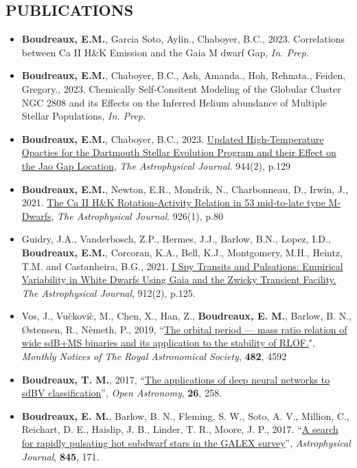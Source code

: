 \documentclass[margin, 10pt]{res} %
\begin{document}
\begin{resume}
\section{PUBLICATIONS}
\begin{itemize}
  \item \textbf{Boudreaux, E.M.}, Garcia Soto, Aylin., Chaboyer, B.C., 2023. Correlations between Ca II H\&K Emission and the Gaia M dwarf Gap, \textit{In. Prep.}
  \item \textbf{Boudreaux, E.M.}, Chaboyer, B.C., Ash, Amanda., Hoh, Rehnata., Feiden, Gregory., 2023. Chemically Self-Consitent Modeling of the Globular Cluster NGC 2808 and its Effects on the Inferred Helium abundance of Multiple Stellar Populations, \textit{In. Prep.}
	\item \textbf{Boudreaux, E.M.}, Chaboyer, B.C., 2023. \href{https://ui.adsabs.harvard.edu/abs/2023arXiv230110798B/abstract}{Updated High-Temperature Opacties for the Dartmouth Stellar Evolution Program and their Effect on the Jao Gap Location}, \textit{The Astrophysical Journal}. 944(2), p.129
	\item \textbf{Boudreaux, E.M.}, Newton, E.R., Mondrik, N., Charbonneau, D., Irwin, J., 2021. \href{https://ui.adsabs.harvard.edu/abs/2022ApJ...929...80B/abstract}{The Ca II H\&K Rotation-Activity Relation in 53 mid-to-late type M-Dwarfs}, \textit{The Astrophysical Journal}. 926(1), p.80
	\item Guidry, J.A., Vanderbosch, Z.P., Hermes, J.J., Barlow, B.N., Lopez, I.D., \textbf{Boudreaux, E.M.}, Corcoran, K.A., Bell, K.J., Montgomery, M.H., Heintz, T.M. and Castanheira, B.G., 2021. \href{https://ui.adsabs.harvard.edu/abs/2021ApJ...912..125G/abstract}{I Spy Transits and Pulsations: Empirical Variability in White Dwarfs Using Gaia and the Zwicky Transient Facility.} \textit{The Astrophysical Journal}, 912(2), p.125.
\item Vos, J., Vu\u{c}kovi\`c, M., Chen, X., Han, Z., \textbf{Boudreaux, E. M.}, Barlow, B. N., \O stensen, R., N\`emeth, P., 2019, ``\href{https://ui.adsabs.harvard.edu/#abs/2019MNRAS.482.4592V/abstract}{The orbital period --- mass ratio relation of wide sdB+MS binaries and its application to the stability of RLOF.}", \textit{Monthly Notices of The Royal Astronomical Society}, \textbf{482}, 4592 
\item \textbf{Boudreaux, T. M.}, 2017, ``\href{https://ui.adsabs.harvard.edu/#abs/2017OAst...26..258B/abstract}{The applications of deep neural networks to sdBV classification}'', \textit{Open Astronomy}, \textbf{26}, 258.
\item \textbf{Boudreaux, E. M.}, Barlow, B. N., Fleming, S. W., Soto, A. V., Million, C., Reichart, D. E., Haislip, J. B., Linder, T. R., Moore, J. P., 2017. ``\href{https://ui.adsabs.harvard.edu/#abs/2017ApJ...845..171B/abstract}{A search for rapidly pulsating hot subdwarf stars in the GALEX survey}'', \textit{Astrophysical Journal}, \textbf{845}, 171.
\end{itemize}


\end{resume}
\end{document}
